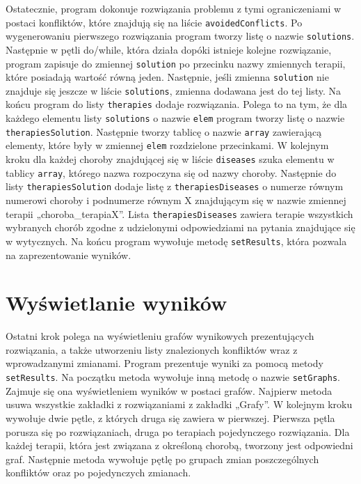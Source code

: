 Ostatecznie, program dokonuje rozwiązania problemu z tymi ograniczeniami w postaci konfliktów, które znajdują się na liście \texttt{avoidedConflicts}. Po wygenerowaniu pierwszego rozwiązania program tworzy listę o nazwie \texttt{solutions}. Następnie w pętli do/while, która działa dopóki istnieje kolejne rozwiązanie, program zapisuje do zmiennej \texttt{solution} po przecinku nazwy zmiennych terapii, które posiadają wartość równą jeden. Następnie, jeśli zmienna \texttt{solution} nie znajduje się jeszcze w liście \texttt{solutions}, zmienna dodawana jest do tej listy. Na końcu program do listy \texttt{therapies} dodaje rozwiązania. Polega to na tym, że dla każdego elementu listy \texttt{solutions} o nazwie \texttt{elem} program tworzy listę o nazwie \texttt{therapiesSolution}. Następnie tworzy tablicę o nazwie \texttt{array} zawierającą elementy, które były w zmiennej \texttt{elem} rozdzielone przecinkami. W kolejnym kroku dla każdej choroby znajdującej się w liście \texttt{diseases} szuka elementu w tablicy \texttt{array}, którego nazwa rozpoczyna się od nazwy choroby. Następnie do listy \texttt{therapiesSolution} dodaje listę z \texttt{therapiesDiseases} o numerze równym numerowi choroby i podnumerze równym X znajdującym się w nazwie zmiennej terapii „choroba\_terapiaX”. Lista \texttt{therapiesDiseases} zawiera terapie wszystkich wybranych chorób zgodne z udzielonymi odpowiedziami na pytania znajdujące się w wytycznych. Na końcu program wywołuje metodę \texttt{setResults}, która pozwala na zaprezentowanie wyników. 

\section{Wyświetlanie wyników}
Ostatni krok polega na wyświetleniu grafów wynikowych prezentujących rozwiązania, a także utworzeniu listy znalezionych konfliktów wraz z wprowadzanymi zmianami. Program prezentuje wyniki za pomocą metody \texttt{setResults}. Na początku metoda wywołuje inną metodę o nazwie \texttt{setGraphs}. Zajmuje się ona wyświetleniem wyników w postaci grafów. Najpierw metoda usuwa wszystkie zakładki z rozwiązaniami z zakładki „Grafy”. W kolejnym kroku wywołuje dwie pętle, z których druga się zawiera w pierwszej. Pierwsza pętla porusza się po rozwiązaniach, druga po terapiach pojedynczego rozwiązania. Dla każdej terapii, która jest związana z określoną chorobą, tworzony jest odpowiedni graf. Następnie metoda wywołuje pętlę po grupach zmian poszczególnych konfliktów oraz po pojedynczych zmianach. 

